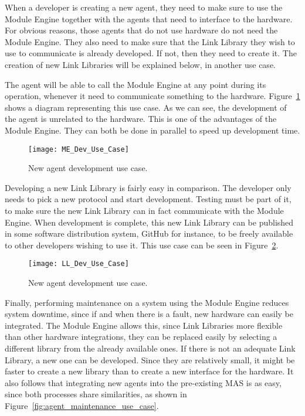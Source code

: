 When a developer is creating a new agent, they need to make sure to use the Module Engine together with the agents that need to interface to the hardware. For obvious reasons, those agents that do not use hardware do not need the Module Engine. They also need to make sure that the Link Library they wish to use to communicate is already developed. If not, then they need to create it. The creation of new Link Libraries will be explained below, in another use case. 

The agent will be able to call the Module Engine at any point during its operation, whenever it need to communicate something to the hardware. Figure~\ref{fig:me_dev_use_case} shows a diagram representing this use case. As we can see, the development of the agent is unrelated to the hardware. This is one of the advantages of the Module Engine. They can both be done in parallel to speed up development time.\\

\begin{figure}[h!]
	\centering
	\texttt{[image: ME\_Dev\_Use\_Case]}
	\caption{New agent development use case.}
	\label{fig:me_dev_use_case}
\end{figure}

Developing a new Link Library is fairly easy in comparison. The developer only needs to pick a new protocol and start development. Testing must be part of it, to make sure the new Link Library can in fact communicate with the Module Engine. When development is complete, this new Link Library can be published in some software distribution system, GitHub for instance, to be freely available to other developers wishing to use it. This use case can be seen in Figure~\ref{fig:ll_dev_use_case}.\\

\begin{figure}[h!]
	\centering
	\texttt{[image: LL\_Dev\_Use\_Case]}
	\caption{New agent development use case.}
	\label{fig:ll_dev_use_case}
\end{figure}

Finally, performing maintenance on a system using the Module Engine reduces system downtime, since if and when there is a fault, new hardware can easily be integrated. The Module Engine allows this, since Link Libraries more flexible than other hardware integrations, they can be replaced easily by selecting a different library from the already available ones. If there is not an adequate Link Library, a new one can be developed. Since they are relatively small, it might be faster to create a new library than to create a new interface for the hardware. It also follows that integrating new agents into the pre-existing \acrshort{MAS} is as easy, since both processes share similarities, as shown in Figure~\ref{fig:agent_maintenance_use_case}.\\

